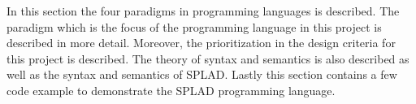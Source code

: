 In this section the four paradigms in programming languages is described. The paradigm which is the focus of the programming language in this project is described in more detail. Moreover, the prioritization in the design criteria for this project is described. The theory of syntax and semantics is also described as well as the syntax and semantics of SPLAD. Lastly this section contains a few code example to demonstrate the SPLAD programming language. 